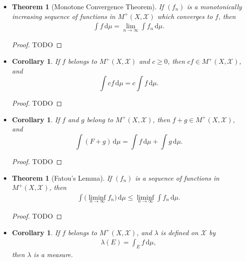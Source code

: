 \documentclass[10pt]{article}
\newtheorem{theorem}[lemma]{Theorem}
\newtheorem{corollary}[lemma]{Corollary}
\newcommand{\dee}{\mathrm{d}}
\newcommand{\mcal}[1]{\mathcal{#1}}
\begin{document}
\begin{itemize}
  \item \begin{theorem}[Monotone Convergence Theorem] If $(f_n)$ is a monotonically increasing sequence of functions in $M^+(X,\mcal{X})$ which converges to $f$, then
  \begin{align*}
    \int f\, \dee\mu = \lim_{n \rightarrow \infty} \int f_n\, \dee\mu.
  \end{align*}
  \end{theorem}

  \begin{proof}
    TODO
  \end{proof}

  \item \begin{corollary}
    If $f$ belongs to $M^+(X,\mcal{X})$ and $c \geq 0$, then $cf \in M^+(X,\mcal{X})$, and $$\int cf\, \dee\mu = c \int f\, \dee\mu.$$
  \end{corollary}

  \begin{proof}
    TODO
  \end{proof}

  \item \begin{corollary}
    If $f$ and $g$ belong to $M^+(X,\mcal{X})$, then $f + g \in M^+(X,\mcal{X})$, and $$\int (F+g)\, \dee\mu = \int f\, \dee\mu + \int g\, \dee\mu.$$
  \end{corollary}

  \begin{proof}
    TODO
  \end{proof}

  \item \begin{theorem}[Fatou's Lemma]
    If $(f_n)$ is a sequence of functions in $M^+(X, \mcal{X})$, then
    \begin{align*}
      \int \Big(\liminf_{n \rightarrow \infty} f_n\Big)\, \dee\mu \leq \liminf_{n \rightarrow \infty} \int f_n\, \dee\mu.
    \end{align*}
  \end{theorem}

  \begin{proof}
    TODO
  \end{proof}

  \item \begin{corollary} \label{corollary:measure-from-integral}
    If $f$ belongs to $M^+(X,\mcal{X})$, and $\lambda$ is defined on $\mcal{X}$ by 
    \begin{align*}
      \lambda(E) = \int_{E} f\, \dee\mu,
    \end{align*}
    then $\lambda$ is a measure.
  \end{corollary}


\end{itemize}
\end{document}
